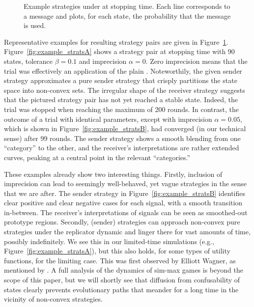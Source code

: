 \documentclass[fleqn,reqno,10pt]{article}
\newcommand{\rd}{\acro{rd}} %
\newcommand{\rdd}{\acro{rdd}} %
\newcommand{\imprecision}{\ensuremath{\alpha}} %
\newcommand{\toler}{\ensuremath{\beta}} %
\newcommand{\ns}{\ensuremath{n_s}} %
\begin{document}
\begin{figure}


  \caption{Example strategies under \rdd at stopping time. Each line corresponds to a message and plots, for each state, the probability that the message is used.}
  \label{fig:example_strats}
\end{figure}

Representative examples for resulting strategy pairs are given in
Figure~\ref{fig:example_strats}. Figure~\ref{fig:example_stratsA} shows a strategy pair at
stopping time with 90 states, tolerance $\toler = 0.1$ and imprecision $\imprecision = 0$. Zero
imprecision means that the trial was effectively an application of the plain \rd. Noteworthily,
the given sender strategy approximates a pure sender strategy that crisply partitions the state
space into non-convex sets. The irregular shape of the receiver strategy suggests that the
pictured strategy pair has not yet reached a stable state. Indeed,
the trial was stopped when reaching the maximum of 200 rounds. In contrast, the outcome of a
trial with identical parameters, except with imprecision $\imprecision = 0.05$, which is shown
in Figure~\ref{fig:example_stratsB}, had converged (in our technical sense) after 99
rounds. The sender strategy shows a smooth blending from one ``category'' to the other, and the
receiver's interpretations are rather extended curves, peaking at a central point in the
relevant ``categories.''

These examples already show two interesting things. Firstly, inclusion of imprecision can lead
to seemingly well-behaved, yet vague strategies in the sense that we are after. The sender
strategy in Figure~\ref{fig:example_stratsB} identifies clear positive and clear negative cases
for each signal, with a smooth transition in-between. The receiver's interpretations of signals
can be seen as smoothed-out prototype regions. Secondly, (sender) strategies can approach
non-convex pure strategies under the replicator dynamic and linger there for vast amounts of
time, possibly indefinitely. We see this in our limited-time simulations (e.g.,
Figure~\ref{fig:example_stratsA}), but this also holds, for some types of utility functions,
for the limiting case. This was first observed by Elliott Wagner, as mentioned by
\citet{OConnor2014-OCOEPC}.  A full analysis of the dynamics of sim-max games is beyond the
scope of this paper, but we will shortly see that diffusion from confusability of states
clearly prevents evolutionary paths that meander for a long time in the vicinity of non-convex
strategies.
\end{document}

